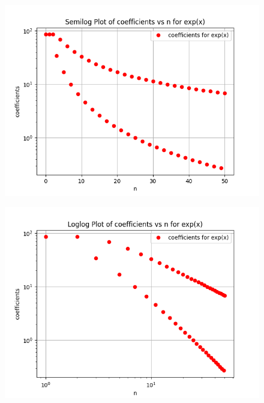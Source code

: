 \documentclass[11pt, a4paper]{article}
\begin{document}
\begin{figure}[H]
     \centering
     \includegraphics[scale=0.8]{Figure_3.png}
\end{figure}

\begin{figure}[H]
     \centering
     \includegraphics[scale=0.8]{Figure_4.png}
\end{figure}
\end{document}
